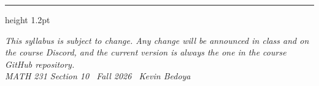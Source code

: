 \documentclass[11pt]{article}
\begin{document}
\vspace{1.2em}
{\color{rule}\hrule height 1.2pt}
\vspace{0.6em}

\begin{center}
\footnotesize\itshape
This syllabus is subject to change. Any change will be announced in class and on
the course Discord, and the current version is always the one in the course
GitHub repository.\\[0.3em]
MATH 231 Section 10 \textbullet\ Fall 2026 \textbullet\ Kevin Bedoya
\end{center}
\end{document}
